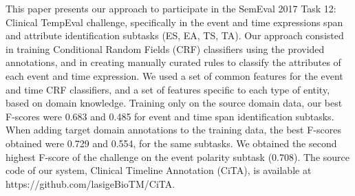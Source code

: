 This paper presents our approach to participate in the SemEval 2017 Task 12: Clinical TempEval challenge, specifically in the event and time expressions span and attribute identification subtasks (ES, EA, TS, TA). Our approach consisted in training Conditional Random Fields (CRF) classifiers using the provided annotations, and in creating manually curated rules to classify the attributes of each event and time expression. We used a set of common features for the event and time CRF classifiers, and a set of features specific to each type of entity, based on domain knowledge. Training only on the source domain data, our best F-scores were 0.683 and 0.485 for event and time span identification subtasks. When adding target domain annotations to the training data, the best F-scores obtained were 0.729 and 0.554, for the same subtasks. We obtained the second highest F-score of the challenge on the event polarity subtask (0.708). The source code of our system, Clinical Timeline Annotation (CiTA), is available at https://github.com/lasigeBioTM/CiTA.
